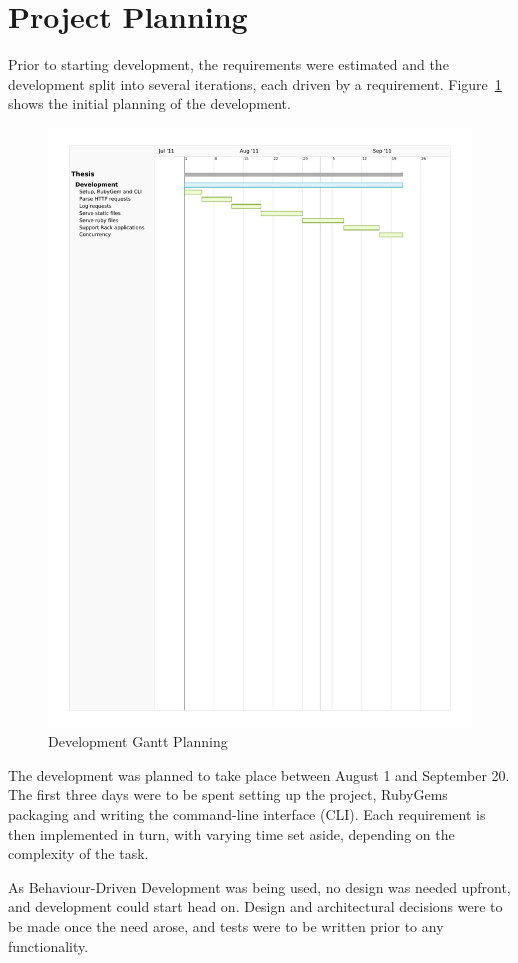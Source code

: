 \section{Project Planning}
Prior to starting development, the requirements were estimated and the
development split into several iterations, each driven by a requirement.
Figure~\ref{gantt} shows the initial planning of the development.

\begin{figure}[htb]
  \centering
  \includegraphics[width=1.0\textwidth]{img/gantt.pdf}
  \caption{Development Gantt Planning}
  \label{gantt}
\end{figure}

The development was planned to take place between August 1 and September 20.
The first three days were to be spent setting up the project, RubyGems
packaging and writing the command-line interface (CLI). Each requirement is
then implemented in turn, with varying time set aside, depending on the
complexity of the task.

As Behaviour-Driven Development was being used, no design was needed upfront,
and development could start head on. Design and architectural decisions were
to be made once the need arose, and tests were to be written prior to any
functionality.
